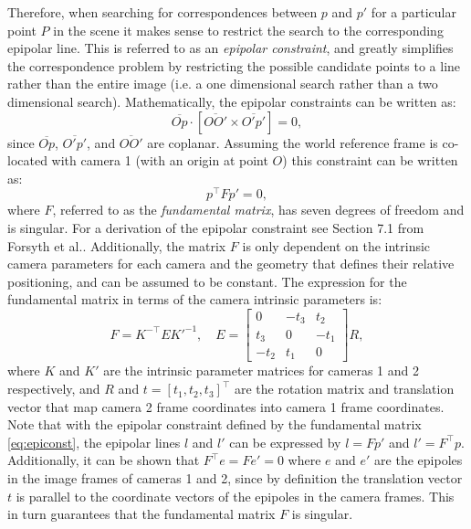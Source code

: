 Therefore, when searching for correspondences between $p$ and $p'$ for a particular point $P$ in the scene it makes sense to restrict the search to the corresponding epipolar line. This is referred to as an \textit{epipolar constraint}, and greatly simplifies the correspondence problem by restricting the possible candidate points to a line rather than the entire image (i.e. a one dimensional search rather than a two dimensional search).
Mathematically, the epipolar constraints can be written as:
\begin{equation}
\overline{Op} \cdot [\overline{OO'} \times \overline{O'p'}] = 0, 
\end{equation}
since $\overline{Op}$, $\overline{O'p'}$, and $\overline{OO'}$ are coplanar. Assuming the world reference frame is co-located with camera 1 (with an origin at point $O$) this constraint can be written as:
\begin{equation} \label{eq:epiconst}
    p^\top  F p'=0,
\end{equation}
where $F$, referred to as the \textit{fundamental matrix}, has seven degrees of freedom and is singular. For a derivation of the epipolar constraint see Section 7.1 from Forsyth et al.\cite[]{ForsythPonce2011}. Additionally, the matrix $F$ is only dependent on the intrinsic camera parameters for each camera and the geometry that defines their relative positioning, and can be assumed to be constant. The expression for the fundamental matrix in terms of the camera intrinsic parameters is:
\begin{equation}
    F = K^{-\top}EK'^{-1}, \quad E = \begin{bmatrix}
    0 & -t_3 & t_2 \\
    t_3 & 0 & -t_1 \\
    -t_2 & t_1 & 0
    \end{bmatrix}R,
\end{equation}
where $K$ and $K'$ are the intrinsic parameter matrices for cameras 1 and 2 respectively, and $R$ and $t = [t_1, t_2, t_3]^\top $ are the rotation matrix and translation vector that map camera 2 frame coordinates into camera 1 frame coordinates.
Note that with the epipolar constraint defined by the fundamental matrix \eqref{eq:epiconst}, the epipolar lines $l$ and $l'$ can be expressed by $l = Fp'$ and $l' = F^\top p$. Additionally, it can be shown that $F^\top e = Fe' = 0$ where $e$ and $e'$ are the epipoles in the image frames of cameras 1 and 2, since by definition the translation vector $t$ is parallel to the coordinate vectors of the epipoles in the camera frames. This in turn guarantees that the fundamental matrix $F$ is singular.

